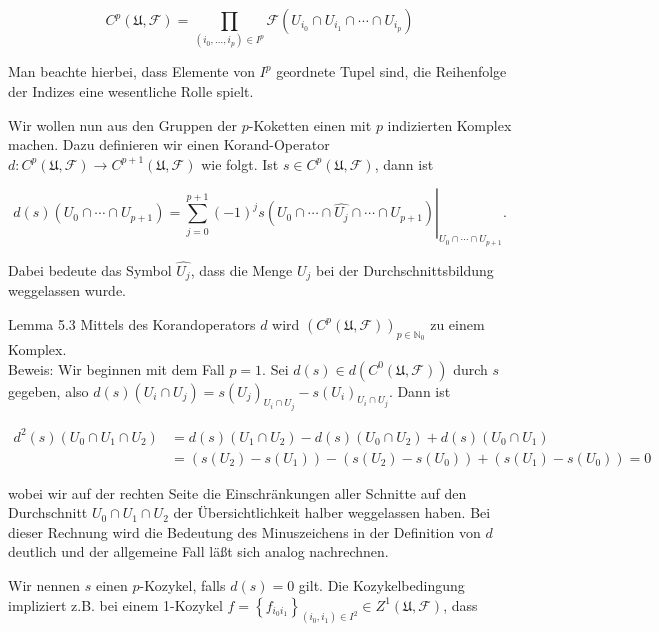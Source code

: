 \documentclass[10pt, letterpaper]{article}
\begin{document}
$$
C^{p}(\mathfrak{U}, \mathcal{F})=\prod_{\left(i_{0}, \ldots, i_{p}\right) \in I^{p}} \mathcal{F}\left(U_{i_{0}} \cap U_{i_{1}} \cap \cdots \cap U_{i_{p}}\right)
$$

Man beachte hierbei, dass Elemente von $I^{p}$ geordnete Tupel sind, die Reihenfolge der Indizes eine wesentliche Rolle spielt.

Wir wollen nun aus den Gruppen der $p$-Koketten einen mit $p$ indizierten Komplex machen. Dazu definieren wir einen Korand-Operator $d: C^{p}(\mathfrak{U}, \mathcal{F}) \rightarrow C^{p+1}(\mathfrak{U}, \mathcal{F})$ wie folgt. Ist $s \in C^{p}(\mathfrak{U}, \mathcal{F})$, dann ist

$$
d(s)\left(U_{0} \cap \cdots \cap U_{p+1}\right)=\left.\sum_{j=0}^{p+1}(-1)^{j} s\left(U_{0} \cap \cdots \cap \widehat{U_{j}} \cap \cdots \cap U_{p+1}\right)\right|_{U_{0} \cap \cdots \cap U_{p+1}} .
$$

Dabei bedeute das Symbol $\widehat{U_{j}}$, dass die Menge $U_{j}$ bei der Durchschnittsbildung weggelassen wurde.

Lemma 5.3 Mittels des Korandoperators $d$ wird $\left(C^{p}(\mathfrak{U}, \mathcal{F})\right)_{p \in \mathbb{N}_{0}}$ zu einem Komplex.\\
Beweis: Wir beginnen mit dem Fall $p=1$. Sei $d(s) \in d\left(C^{0}(\mathfrak{U}, \mathcal{F})\right)$ durch $s$ gegeben, also $d(s)\left(U_{i} \cap U_{j}\right)=s\left(U_{j}\right)_{U_{i} \cap U_{j}}-s\left(U_{i}\right)_{U_{i} \cap U_{j}}$. Dann ist

$$
\begin{aligned}
d^{2}(s)\left(U_{0} \cap U_{1} \cap U_{2}\right) & =d(s)\left(U_{1} \cap U_{2}\right)-d(s)\left(U_{0} \cap U_{2}\right)+d(s)\left(U_{0} \cap U_{1}\right) \\
& =\left(s\left(U_{2}\right)-s\left(U_{1}\right)\right)-\left(s\left(U_{2}\right)-s\left(U_{0}\right)\right)+\left(s\left(U_{1}\right)-s\left(U_{0}\right)\right)=0
\end{aligned}
$$

wobei wir auf der rechten Seite die Einschränkungen aller Schnitte auf den Durchschnitt $U_{0} \cap U_{1} \cap U_{2}$ der Übersichtlichkeit halber weggelassen haben. Bei dieser Rechnung wird die Bedeutung des Minuszeichens in der Definition von $d$ deutlich und der allgemeine Fall läßt sich analog nachrechnen.

Wir nennen $s$ einen $p$-Kozykel, falls $d(s)=0$ gilt. Die Kozykelbedingung impliziert z.B. bei einem 1-Kozykel $f=\left\{f_{i_{0} i_{1}}\right\}_{\left(i_{0}, i_{1}\right) \in I^{2}} \in Z^{1}(\mathfrak{U}, \mathcal{F})$, dass
\end{document}
